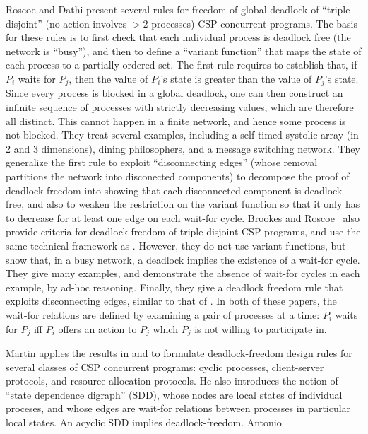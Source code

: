 Roscoe and Dathi \cite{RD87} present several rules for freedom of global deadlock of
``triple disjoint'' (no action involves $> 2$ processes) CSP concurrent
programs. The basis for these rules is to first check that each individual process is deadlock free
(\ie the network is ``busy''), and then to define a ``variant function'' that maps the state of each
process to a partially ordered set. The first rule requires to establish that, if $P_i$ waits for
$P_j$, then the value of $P_i$'s state is greater than the value of $P_j$'s state. 
Since every process is blocked in a global deadlock, one can then construct an infinite sequence of
processes with strictly decreasing values, which are therefore all distinct. This cannot happen in a
finite network, and hence some process is not blocked.
They treat several examples, including
a self-timed systolic array (in 2 and 3 dimensions), dining philosophers, and a message switching
network.  They generalize the first rule to exploit ``disconnecting edges'' (whose removal
partitions the network into disconected components) to decompose the proof of deadlock freedom into
showing that each disconnected component is deadlock-free, and also to weaken the restriction on the
variant function so that it only has to decrease for at least one edge on each wait-for cycle.
%
Brookes and Roscoe~\cite{BR91} also provide criteria for deadlock
freedom of triple-disjoint CSP programs, and use the same technical framework as
\cite{RD87}.  However, they do not use variant functions, but show that, in a busy
network, a deadlock implies the existence of a wait-for cycle. They give many examples,
and demonstrate the absence of wait-for cycles in each example, by ad-hoc
reasoning. Finally, they give a deadlock freedom rule that exploits disconnecting edges,
similar to that of \cite{RD87}.
%
In both of these papers, the wait-for relations are defined by examining a pair of processes
at a time: $P_i$ waits for $P_j$ iff $P_i$ offers an action to $P_j$ which $P_j$ is
not willing to participate in.

Martin \cite{Ma96} applies the results in \cite{RD87} and \cite{BR91} to formulate
deadlock-freedom design rules for several classes of
CSP concurrent programs: cyclic processes, client-server protocols, and resource
allocation protocols. He also introduces the notion of ``state dependence digraph'' (SDD), whose
nodes are local states of individual proceses, and whose edges are wait-for relations
between processes in particular local states. An acyclic SDD implies deadlock-freedom.
%
Antonio \etal \cite{AGR16}



